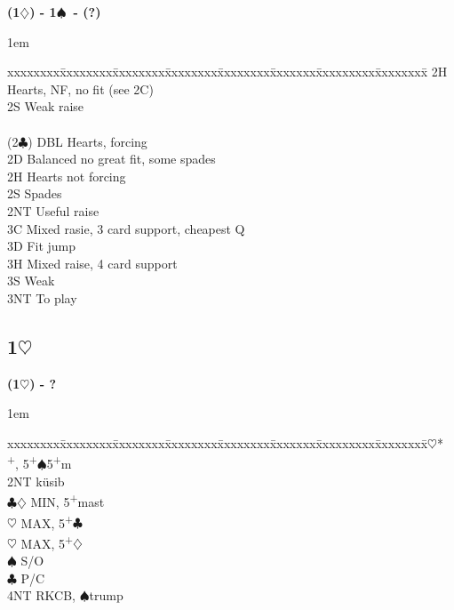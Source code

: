 \documentclass[10pt]{article}
\renewcommand{\c}{$\clubsuit$}
\renewcommand{\d}{$\diamondsuit$}
\newcommand{\h}{$\heartsuit$}
\newcommand{\s}{$\spadesuit$}
\newcommand{\p}{\textsuperscript{+}}
\newenvironment{bidtable}[1][]
{\textbf{#1}
  \begin{adjustwidth}{1em}{}
    \addvspace{2pt}
    \begin{tabbing}
      xxxxxxxx\=xxxxxxxx\=xxxxxxxx\=xxxxxxxx\=xxxxxxxx\=xxxxxxx\=xxxxxxxxx\=xxxxxxxx\=\kill}
{\end{tabbing}\end{adjustwidth}\bigskip}%
\newcommand{\pdfh}{\texorpdfstring{\h{}}{H}}
\begin{document}
\begin{bidtable}[(1\d) - 1\s\ - (?)]
       \> 2H    \> Hearts, NF, no fit (see 2C)             \\
       \> 2S    \> Weak raise                              \\
                                                           \\
(2\c)  \> DBL   \> Hearts, forcing                         \\
       \> 2D    \> Balanced no great fit, some spades      \\
       \> 2H    \> Hearts not forcing                      \\
       \> 2S    \> Spades                                  \\
       \> 2NT   \> Useful raise                            \\
       \> 3C    \> Mixed rasie, 3 card support, cheapest Q \\
       \> 3D    \> Fit jump                                \\
       \> 3H    \> Mixed raise, 4 card support             \\
       \> 3S    \> Weak                                    \\
       \> 3NT   \> To play
\end{bidtable}


\subsection{1\pdfh}

\begin{bidtable}[(1\h) - ?]
2\h* {}\p, 5\p\s 5\p m             \\
     \> 2NT \> küsib                  \\
     \>     \c\d \> MIN, 5\p mast \\
     \>     \h   \> MAX, 5\p\c    \\
     \>     \h   \> MAX, 5\p\d    \\
     \s \> S/O                    \\
     \c \> P/C                    \\
     \> 4NT \> RKCB, \s trump
\end{bidtable}
\end{document}
